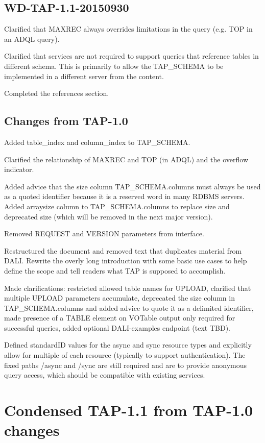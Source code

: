 \documentclass[11pt,letter]{ivoa}
\newcommand{\tapschema}{TAP\_SCHEMA}
\newcommand{\tapschema}{\mbox{%
  \relsize{-0.5}TAP\discretionary{-}{}{\kern-2pt\_}SCHEMA}}
\begin{document}
\subsection{WD-TAP-1.1-20150930}

Clarified that MAXREC always overrides limitations in the query (e.g. 
TOP in an ADQL query).

Clarified that services are not required to support queries that reference tables 
in different schema. This is primarily to allow the \tapschema{} to be implemented 
in a different server from the content.

Completed the references section.

\subsection{Changes from TAP-1.0}

Added table\_index and column\_index to \tapschema.

Clarified the relationship of MAXREC and TOP (in ADQL) and the overflow 
indicator.

Added advice that the size column \tapschema.columns must always be used 
as a quoted identifier because it is a reserved word in many RDBMS 
servers. Added arraysize column to \tapschema.columns to replace size and 
deprecated size (which will be removed in the next major version).
 
Removed REQUEST and VERSION parameters from interface.

Restructured the document and removed text that duplicates material from DALI. 
Rewrite the overly long introduction with some basic use cases to help define 
the scope and tell readers what TAP is supposed to accomplish.

Made clarifications: restricted allowed table names for UPLOAD, clarified that 
multiple UPLOAD parameters accumulate, deprecated the size column in 
\tapschema.columns and added advice to quote it as a delimited 
identifier, made presence of a TABLE element on VOTable output only required for 
successful queries, added optional DALI-examples endpoint (text TBD).

Defined standardID values for the async and sync resource types and explicitly 
allow for multiple of each resource (typically to support authentication). The 
fixed paths /async and /sync are still required and are to provide anonymous 
query access, which should be compatible with existing services.

\section{Condensed TAP-1.1 from TAP-1.0 changes}
\end{document}
